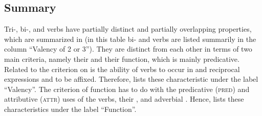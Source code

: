 \subsection{Summary}
\label{Para_5.4.11}
Tri-, bi-, and  verbs have partially distinct and partially overlapping properties, which are summarized in   (in this table bi- and  verbs are listed summarily in the column ``Valency of 2 or 3''). They are distinct from each other in terms of two main criteria, namely their  and their function, which is mainly predicative. Related to the criterion on  is the ability of verbs to occur in  and reciprocal expressions and to be affixed. Therefore,  lists these characteristic under the label ``Valency''. The criterion of function has to do with the predicative (\textsc{pred}) and attributive (\textsc{attr}) uses of the verbs, their , and adverbial . Hence,  lists these characteristics under the label ``Function''.

